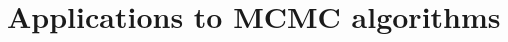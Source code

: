 \documentclass[report.tex]{subfiles}
\begin{document}
\chapter{Applications to MCMC algorithms}
\label{chapter-bouncy-particle-sampler}
\end{document}
